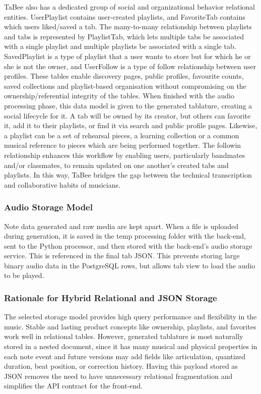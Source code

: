 \documentclass[a4paper, 12pt, titlepage]{article}
\begin{document}
TaBee also has a dedicated group of social and organizational behavior relational entities. UserPlaylist contains user-created playlists, and FavoriteTab contains which users liked/saved a tab. The many-to-many relationship between playlists and tabs is represented by PlaylistTab, which lets multiple tabs be associated with a single playlist and multiple playlists be associated with a single tab. SavedPlaylist is a type of playlist that a user wants to store but for which he or she is not the owner, and UserFollow is a type of follow relationship between user profiles. These tables enable discovery pages, public profiles, favourite counts, saved collections and playlist-based organisation without compromising on the ownership/referential integrity of the tables. When finished with the audio processing phase, this data model is given to the generated tablature, creating a social lifecycle for it. A tab will be owned by its creator, but others can favorite it, add it to their playlists, or find it via search and public profile pages. Likewise, a playlist can be a set of rehearsal pieces, a learning collection or a common musical reference to pieces which are being performed together. The followin relationship enhances this workflow by enabling users, particularly bandmates and/or classmates, to remain updated on one another's created tabs and playlists. In this way, TaBee bridges the gap between the technical transcription and collaborative habits of musicians.

\subsubsection{Audio Storage Model}

Note data generated and raw media are kept apart. When a file is uploaded during generation, it is saved in the temp processing folder with the back-end, sent to the Python processor, and then stored with the back-end's audio storage service. This is referenced in the final tab JSON. This prevents storing large binary audio data in the PostgreSQL rows, but allows tab view to load the audio to be played.

\subsubsection{Rationale for Hybrid Relational and JSON Storage}

The selected storage model provides high query performance and flexibility in the music. Stable and lasting product concepts like ownership, playlists, and favorites work well in relational tables. However, generated tablature is most naturally stored in a nested document, since it has many musical and physical properties in each note event and future versions may add fields like articulation, quantized duration, beat position, or correction history. Having this payload stored as JSON removes the need to have unnecessary relational fragmentation and simplifies the API contract for the front-end.
\end{document}
